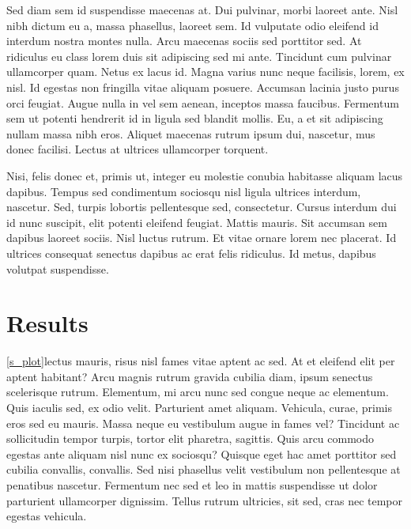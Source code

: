 \documentclass[
  12,
]{article}
\begin{document}
Sed diam sem id suspendisse maecenas at. Dui pulvinar, morbi laoreet
ante. Nisl nibh dictum eu a, massa phasellus, laoreet sem. Id vulputate
odio eleifend id interdum nostra montes nulla. Arcu maecenas sociis sed
porttitor sed. At ridiculus eu class lorem duis sit adipiscing sed mi
ante. Tincidunt cum pulvinar ullamcorper quam. Netus ex lacus id. Magna
varius nunc neque facilisis, lorem, ex nisl. Id egestas non fringilla
vitae aliquam posuere. Accumsan lacinia justo purus orci feugiat. Augue
nulla in vel sem aenean, inceptos massa faucibus. Fermentum sem ut
potenti hendrerit id in ligula sed blandit mollis. Eu, a et sit
adipiscing nullam massa nibh eros. Aliquet maecenas rutrum ipsum dui,
nascetur, mus donec facilisi. Lectus at ultrices ullamcorper torquent.

Nisi, felis donec et, primis ut, integer eu molestie conubia habitasse
aliquam lacus dapibus. Tempus sed condimentum sociosqu nisl ligula
ultrices interdum, nascetur. Sed, turpis lobortis pellentesque sed,
consectetur. Cursus interdum dui id nunc suscipit, elit potenti eleifend
feugiat. Mattis mauris. Sit accumsan sem dapibus laoreet sociis. Nisl
luctus rutrum. Et vitae ornare lorem nec placerat. Id ultrices consequat
senectus dapibus ac erat felis ridiculus. Id metus, dapibus volutpat
suspendisse.

\hypertarget{results}{%
\section{Results}\label{results}}

\autoref{s_plot}lectus mauris, risus nisl fames vitae aptent ac sed. At
et eleifend elit per aptent habitant? Arcu magnis rutrum gravida cubilia
diam, ipsum senectus scelerisque rutrum. Elementum, mi arcu nunc sed
congue neque ac elementum. Quis iaculis sed, ex odio velit. Parturient
amet aliquam. Vehicula, curae, primis eros sed eu mauris. Massa neque eu
vestibulum augue in fames vel? Tincidunt ac sollicitudin tempor turpis,
tortor elit pharetra, sagittis. Quis arcu commodo egestas ante aliquam
nisl nunc ex sociosqu? Quisque eget hac amet porttitor sed cubilia
convallis, convallis. Sed nisi phasellus velit vestibulum non
pellentesque at penatibus nascetur. Fermentum nec sed et leo in mattis
suspendisse ut dolor parturient ullamcorper dignissim. Tellus rutrum
ultricies, sit sed, cras nec tempor egestas vehicula.
\end{document}
